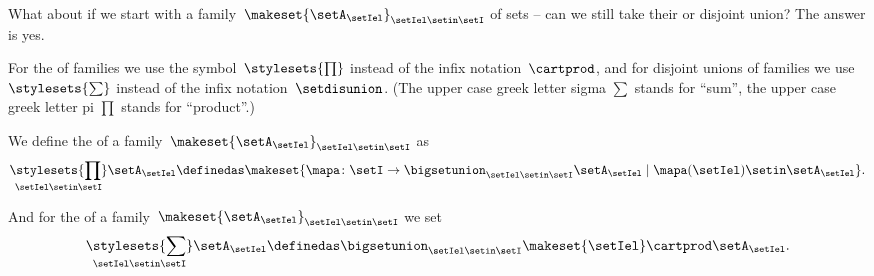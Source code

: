 What about if we start with a family~$\makeset{ \setA_\setIel }_{\setIel \setin\setI}$ of sets -- can we still take their  or disjoint union?
The answer is yes.

For the  of families we use the symbol~$\stylesets{\prod}$ instead of the infix notation~$\cartprod$, and for disjoint unions of families we use~$\stylesets{\sum}$ instead of the infix notation~$\setdisunion$.
(The upper case greek letter sigma $\sum$ stands for ``sum'', the upper case greek letter pi $\prod$ stands for ``product''.)

We define the  of a family~$\makeset{ \setA_{\setIel} }_{\setIel \setin\setI}$ as
\begin{equation}
    \underset{\setIel \setin\setI}{\stylesets{\prod}} \setA_{\setIel} \definedas \makeset{ \mapa \colon \setI \to \bigsetunion_{\setIel \setin\setI } \setA_{\setIel} \mid \mapa(\setIel) \setin\setA_{\setIel}}.
\end{equation}

And for the  of a family~$\makeset{ \setA_{\setIel} }_{\setIel \setin\setI}$ we set
\begin{equation}
    \underset{\setIel \setin\setI}{\stylesets{\sum}} \setA_{\setIel} \definedas \bigsetunion_{\setIel \setin\setI} \makeset{ \setIel } \cartprod \setA_{\setIel}.
\end{equation}

